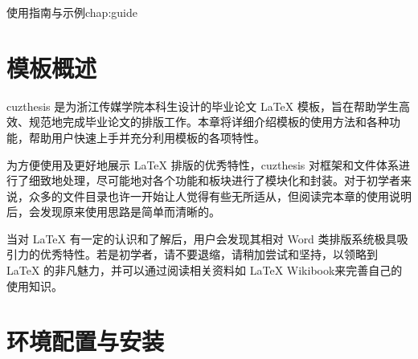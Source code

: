 \begin{cuzchapter}{使用指南与示例}{chap:guide}


    \section{模板概述}\label{sec:overview}

    cuzthesis 是为浙江传媒学院本科生设计的毕业论文 LaTeX 模板，旨在帮助学生高效、规范地完成毕业论文的排版工作。本章将详细介绍模板的使用方法和各种功能，帮助用户快速上手并充分利用模板的各项特性。

    为方便使用及更好地展示 LaTeX 排版的优秀特性，cuzthesis 对框架和文件体系进行了细致地处理，尽可能地对各个功能和板块进行了模块化和封装。对于初学者来说，众多的文件目录也许一开始让人觉得有些无所适从，但阅读完本章的使用说明后，会发现原来使用思路是简单而清晰的。

    当对 LaTeX 有一定的认识和了解后，用户会发现其相对 Word 类排版系统极具吸引力的优秀特性。若是初学者，请不要退缩，请稍加尝试和坚持，以领略到 LaTeX 的非凡魅力，并可以通过阅读相关资料如 LaTeX Wikibook\citep{wikibook2014latex}来完善自己的使用知识。

    \section{环境配置与安装}\label{sec:installation}


\end{cuzchapter}
